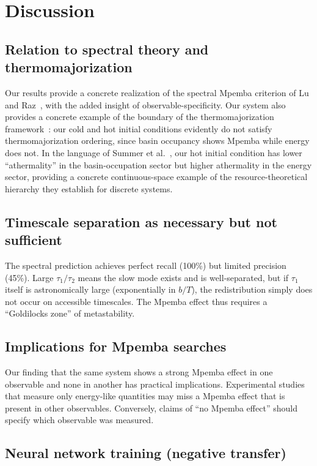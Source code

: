 \documentclass[aps,pre,reprint,superscriptaddress,showpacs]{revtex4-2}
\begin{document}
\section{Discussion}

\subsection{Relation to spectral theory and thermomajorization}

Our results provide a concrete realization of the spectral Mpemba criterion of
Lu and Raz~\cite{LuRaz2017}, with the added insight of
observable-specificity. Our system also provides a concrete example of the
boundary of the thermomajorization framework~\cite{VuHayakawa2025}: our cold
and hot initial conditions evidently do not satisfy thermomajorization ordering,
since basin occupancy shows Mpemba while energy does not. In the language of
Summer et al.~\cite{Summer2026}, our hot initial condition has lower
``athermality'' in the basin-occupation sector but higher athermality in the
energy sector, providing a concrete continuous-space example of the
resource-theoretical hierarchy they establish for discrete systems.

\subsection{Timescale separation as necessary but not sufficient}

The spectral prediction achieves perfect recall (100\%) but limited precision
(45\%). Large $\tau_1/\tau_2$ means the slow mode exists and is
well-separated, but if $\tau_1$ itself is astronomically large (exponentially
in $b/T$), the redistribution simply does not occur on accessible timescales.
The Mpemba effect thus requires a ``Goldilocks zone'' of metastability.

\subsection{Implications for Mpemba searches}

Our finding that the same system shows a strong Mpemba effect in one observable
and none in another has practical implications. Experimental studies that
measure only energy-like quantities may miss a Mpemba effect that is present in
other observables. Conversely, claims of ``no Mpemba effect'' should specify
which observable was measured.

\subsection{Neural network training (negative transfer)}
\end{document}
